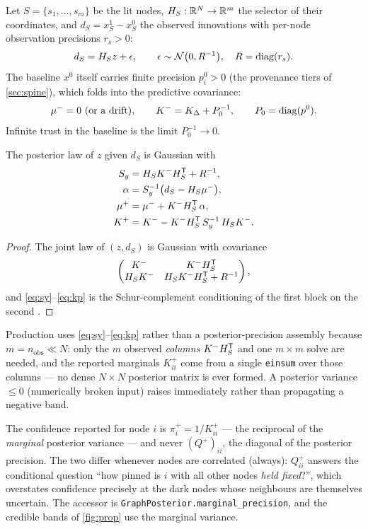 \documentclass[11pt]{article}
\newcommand{\Kdel}{K_{\Delta}}
\begin{document}
Let $S=\{s_1,\dots,s_m\}$ be the lit nodes, $H_S:\mathbb{R}^N\to\mathbb{R}^m$ the selector of
their coordinates, and $d_S=x^1_S-x^0_S$ the observed innovations with
per-node observation precisions $r_s>0$:
\[
d_S=H_Sz+\epsilon,\qquad \epsilon\sim\mathcal N\big(0,R^{-1}\big),\quad
R=\operatorname{diag}(r_s).
\]
The baseline $x^0$ itself carries finite precision $p^0_i>0$ (the provenance
tiers of \cref{sec:spine}), which folds into the predictive covariance:
\[
\mu^-=0\ (\text{or a drift}),\qquad
K^-=\Kdel+P_0^{-1},\qquad P_0=\diag(p^0).
\]
Infinite trust in the baseline is the limit $P_0^{-1}\to0$.

\begin{proposition}
\label{prop:cov-update}
The posterior law of $z$ given $d_S$ is Gaussian with
\begin{align}
S_y&=H_SK^-H_S^{\mathsf{T}}+R^{-1}, \label{eq:sy}\\
\alpha&=S_y^{-1}\big(d_S-H_S\mu^-\big), \label{eq:alpha}\\
\mu^+&=\mu^-+K^-H_S^{\mathsf{T}}\,\alpha, \label{eq:mup}\\
K^+&=K^--K^-H_S^{\mathsf{T}}\,S_y^{-1}\,H_SK^-. \label{eq:kp}
\end{align}
\end{proposition}

\begin{proof}
The joint law of $(z,d_S)$ is Gaussian with covariance
\[
\begin{pmatrix}K^- & K^-H_S^{\mathsf{T}}\\ H_SK^- & H_SK^-H_S^{\mathsf{T}}+R^{-1}\end{pmatrix},
\]
and \eqref{eq:sy}--\eqref{eq:kp} is the Schur-complement conditioning of the
first block on the second \cite{RasmussenWilliams2006}.
\end{proof}

\begin{remark}
Production uses \eqref{eq:sy}--\eqref{eq:kp} rather than a posterior-precision
assembly because $m=n_{\text{obs}}\ll N$: only the $m$ observed \emph{columns}
$K^-H_S^{\mathsf{T}}$ and one $m\times m$ solve are needed, and the reported marginals
$K^+_{ii}$ come from a single \texttt{einsum} over those columns --- no dense
$N\times N$ posterior matrix is ever formed. A posterior variance
$\le0$ (numerically broken input) raises immediately rather than propagating a
negative band.
\end{remark}

\begin{caution}
The confidence reported for node $i$ is $\pi^+_i=1/K^+_{ii}$ --- the reciprocal
of the \emph{marginal} posterior variance --- and never $(Q^+)_{ii}$, the
diagonal of the posterior precision. The two differ whenever nodes are
correlated (always): $Q^+_{ii}$ answers the conditional question ``how pinned is
$i$ with all other nodes \emph{held fixed}?'', which overstates confidence
precisely at the dark nodes whose neighbours are themselves uncertain. The
accessor is \texttt{GraphPosterior.marginal\_precision}, and the credible bands
of \cref{fig:prop} use the marginal variance.
\end{caution}
\end{document}
